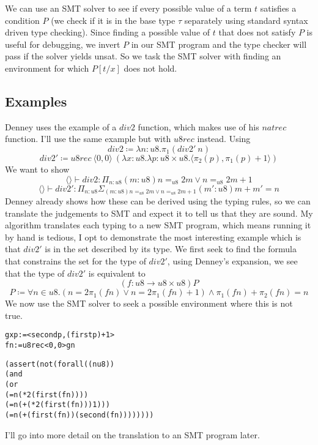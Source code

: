 \documentclass[12pt,a4paper,titlepage]{article}
\begin{document}
    We can use an SMT solver to see if every possible value of a term $t$ satisfies a condition $P$ (we check
    if it is in the base type $\tau$ separately using standard syntax driven type checking).
    Since finding a possible value of $t$ that does not satisfy $P$ is useful for debugging, we invert $P$ in
    our SMT program and the type checker will pass if the solver yields unsat.
    So we task the SMT solver with finding an environment for which $P[t/x]$ does not hold.

    \subsection{Examples}
    Denney uses the example of a $div2$ function, which makes use of his $natrec$ function.
    I'll use the same example but with $u8rec$ instead. Using
    \[
        div2 \coloneqq \lambda n:u8 . \pi_1 (div2'\ n)
    \]\[
        div2' \coloneqq u8rec\ \langle 0, 0 \rangle\ (\lambda x: u8 . \lambda p: u8 \times u8 .
        \langle \pi_2 (p), \pi_1 (p)+1 \rangle )
    \]
    We want to show
    \[
        \langle \rangle \vdash div2 : \Pi_{n:u8}(m:u8)n =_{u8} 2m \lor n =_{u8} 2m+1
    \]\[
        \langle \rangle \vdash div2' : \Pi_{n:u8} \Sigma_{(m:u8)n =_{u8} 2m \lor n =_{u8} 2m+1} (m': u8) m+m'=n
    \]
    Denney already shows how these can be derived using the typing rules, so we can translate the judgements to SMT
    and expect it to tell us that they are sound.
    My algorithm translates each typing to a new SMT program, which means running it by hand is tedious, I opt to
    demonstrate the most interesting example which is that $div2'$ is in the set described by its type.
    We first seek to find the formula that constrains the set for the type of $div2'$, using Denney's
    expansion, we see that the type of $div2'$ is equivalent to
    \[
        (f: u8 \rightarrow u8 \times u8)P
    \]\[
        P \coloneqq \forall n \in u8 .
        (n = 2 \pi_1 (f n) \lor n = 2 \pi_1 (f n) + 1)
        \land \pi_1 (f n) + \pi_2 (f n) = n
    \]
    We now use the SMT solver to seek a possible environment where this is not true.
    \begin{alltt}
        g x p := <second p, (first p) + 1>
        f n := u8rec <0, 0> g n

        (assert (not (forall ((n u8))
          (and
            (or
              (= n (* 2 (first (f n))))
              (= n (+ (* 2 (first (f n))) 1)))
            (= n (+ (first (f n)) (second (f n))))))))
    \end{alltt}

    I'll go into more detail on the translation to an SMT program later.

    
    
\end{document}
